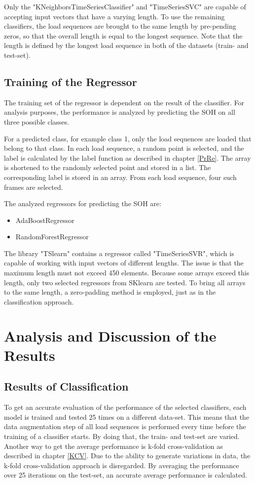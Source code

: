 Only the "KNeighborsTimeSeriesClassifier" and "TimeSeriesSVC" are capable of accepting input vectors that have a varying length. To use the remaining classifiers, the load sequences are brought to the same length by pre-pending zeros, so that the overall length is equal to the longest sequence. Note that the length is defined by the longest load sequence in both of the datasets (train- and test-set).




\subsection{Training of the Regressor}
The training set of the regressor is dependent on the result of the classifier. For analysis purposes, the performance is analyzed by predicting the SOH on all three possible classes. 

For a predicted class, for example class 1, only the load sequences are loaded that belong to that class. In each load sequence, a random point is selected, and the label is calculated by the label function as described in chapter \ref{PrRe}. The array is shortened to the randomly selected point and stored in a list. The corresponding label is stored in an array. From each load sequence, four such frames are selected.

The analyzed regressors for predicting the SOH are:
\begin{itemize} 
	\itemsep-0.5em 
	\item AdaBoostRegressor \cite{tslearn}
	\item RandomForestRegressor \cite{tslearn}
\end{itemize}

The library "TSlearn" \cite{tslearn} contains a regressor called "TimeSeriesSVR", which is capable of working with input vectors of different lengths. The issue is that the maximum length must not exceed 450 elements. Because some arrays exceed this length, only two selected regressors from SKlearn \cite{SKlearn} are tested. To bring all arrays to the same length, a zero-padding method is employed, just as in the classification approach.

\section{Analysis and Discussion of the Results}
\subsection{Results of Classification}
To get an accurate evaluation of the performance of the selected classifiers, each model is trained and tested 25 times on a different data-set. This means that the data augmentation step of all load sequences is performed every time before the training of a classifier starts.
By doing that, the train- and test-set are varied. Another way to get the average performance is k-fold cross-validation as described in chapter \ref{KCV}. Due to the ability to generate variations in data, the k-fold cross-validation approach is disregarded. By averaging the performance over 25 iterations on the test-set, an accurate average performance is calculated. 

